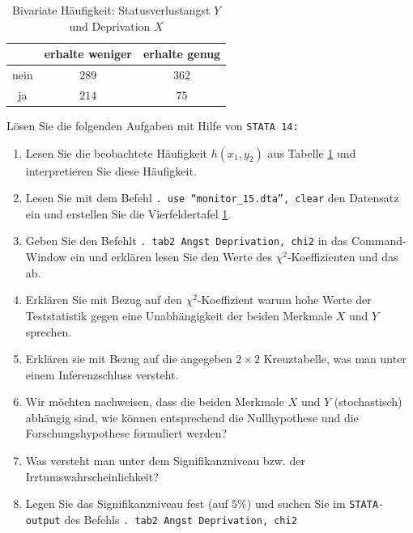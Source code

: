 \documentclass[11pt]{article}
\begin{document}
\begin{enumerate}

  \begin{table}[ht]
\centering
\caption{Bivariate Häufigkeit: Statusverlustangst $Y$ und Deprivation $X$}



\begin{center}
\begin{tabular}{|c|c|c|}
	\hline %
             & erhalte weniger   & erhalte genug  \\ \hline
        nein & $289$  & $362$                  \\ \hline
          ja & $214$  & $75$        \\ \hline
\end{tabular}
\end{center}
\label{depri_angst}
\end{table}
Lösen Sie die folgenden Aufgaben mit Hilfe von  \texttt{STATA 14:}
\begin{enumerate}
\item{Lesen Sie die beobachtete Häufigkeit $h(x_{1},y_{2})$ aus Tabelle \ref{depri_angst}
und interpretieren Sie diese Häufigkeit.}
 \item {Lesen Sie mit dem Befehl \texttt{. use ``monitor\_15.dta'', clear} den Datensatz ein und erstellen  Sie die Vierfeldertafel \ref{depri_angst}.}
 \item{Geben Sie den Befehlt \texttt{. tab2 Angst Deprivation, chi2} in das Command-Window ein
 und erklären lesen Sie den Werte des $\chi^{2}$-Koeffizienten und das  ab.}
 \item{ Erklären Sie mit Bezug auf den $\chi^{2}$-Koeffizient warum hohe Werte
 der Teststatistik gegen eine Unabhängigkeit der beiden
 Merkmale $X$ und $Y$ sprechen.}
 \item{Erklären sie mit Bezug auf die angegeben $2 \times 2$ Kreuztabelle, was man unter einem Inferenzschluss versteht. }
 \item{Wir möchten nachweisen, dass die beiden Merkmale $X$ und $Y$ (stochastisch) abhängig sind, wie können entsprechend die Nullhypothese
 und die Forschungshypothese formuliert werden?}%
 \item{Was versteht man unter dem Signifikanzniveau bzw. der Irrtumswahrscheinlichkeit?}
 \item{Legen Sie das Signifikanzniveau fest (auf $5\%$) und suchen Sie im \texttt{STATA-output} des Befehls \texttt{. tab2 Angst Deprivation, chi2}
}
\end{enumerate}
\end{enumerate}
\end{document}
